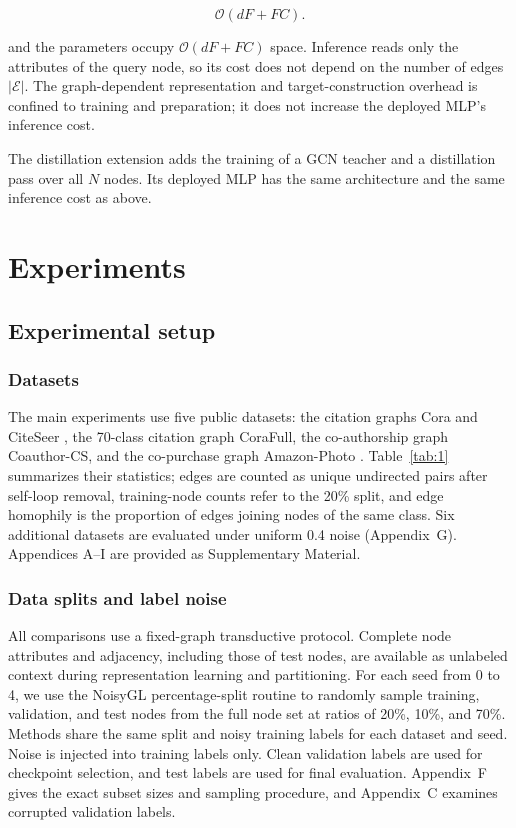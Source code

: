 \documentclass[10pt,letterpaper,nopreprintline]{elsarticle}
\theoremstyle{plain}
\begin{document}
\begin{equation}\label{eq:23}
\mathcal{O}(dF + FC).
\end{equation}

and the parameters occupy \(\mathcal{O}(dF + FC)\) space. Inference reads only the attributes of the query node, so its cost does not depend on the number of edges \(|\mathcal{E}|\). The graph-dependent representation and target-construction overhead is confined to training and preparation; it does not increase the deployed MLP's inference cost.

The distillation extension adds the training of a GCN teacher and a distillation pass over all \(N\) nodes. Its deployed MLP has the same architecture and the same inference cost as above.

\FloatBarrier

\section{Experiments}\label{sec:4}

\subsection{Experimental setup}\label{sec:4.1}

\subsubsection{Datasets}\label{sec:4.1.1}

The main experiments use five public datasets: the citation graphs Cora and CiteSeer \cite{ref69}, the 70-class citation graph CoraFull, the co-authorship graph Coauthor-CS, and the co-purchase graph Amazon-Photo \cite{ref70}. Table~\ref{tab:1} summarizes their statistics; edges are counted as unique undirected pairs after self-loop removal, training-node counts refer to the 20\% split, and edge homophily is the proportion of edges joining nodes of the same class. Six additional datasets are evaluated under uniform 0.4 noise (Appendix~G). Appendices A--I are provided as Supplementary Material.



\subsubsection{Data splits and label noise}\label{sec:4.1.2}

All comparisons use a fixed-graph transductive protocol. Complete node attributes and adjacency, including those of test nodes, are available as unlabeled context during representation learning and partitioning. For each seed from 0 to 4, we use the NoisyGL percentage-split routine to randomly sample training, validation, and test nodes from the full node set at ratios of 20\%, 10\%, and 70\%. Methods share the same split and noisy training labels for each dataset and seed. Noise is injected into training labels only. Clean validation labels are used for checkpoint selection, and test labels are used for final evaluation. Appendix~F gives the exact subset sizes and sampling procedure, and Appendix~C examines corrupted validation labels.
\end{document}
